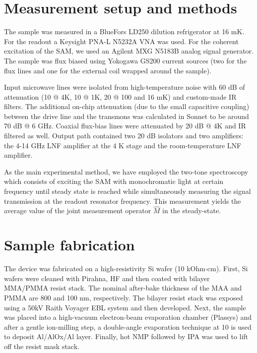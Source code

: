 \documentclass[%
 pra,
 amsmath,amssymb,
 reprint,%
]{revtex4-1}
\begin{document}
\section{Measurement setup and 
methods}\label{sec:meas_setup}
The sample was measured in a BlueFors LD250 dilution refrigerator at 16 mK. For the readout a Keysight PNA-L N5232A VNA was used. For the coherent excitation of the SAM, we used an Agilent MXG N5183B analog signal generator. The sample was 
flux biased using Yokogawa GS200 current sources (two for the flux lines and one for the external coil wrapped around the sample).

Input microwave lines were isolated from 
high-temperature noise with 60 dB of attenuation 
(10 @ 4K, 10 @ 1K, 20 @ 100 and 16 mK) and 
custom-made IR filters. The additional on-chip 
attenuation (due to the small capacitive 
coupling) between the drive line and the 
transmons was calculated in Sonnet to be around 
70 dB @ 6 GHz. Coaxial flux-bias lines were 
attenuated by 20 dB @ 4K and IR filtered as well. 
Output path contained two 20 dB isolators and two 
amplifiers: the 4-14 GHz LNF amplifier at the 4 K 
stage and the room-temperature LNF amplifier.

As the main experimental method, we have employed the two-tone spectroscopy which consists of exciting the SAM with monochromatic light at certain frequency until steady state is reached while simultaneously measuring the signal transmission at the readout resonator frequency. This measurement yields the average value of the joint measurement operator $\hat M$ in the steady-state.

\section{Sample fabrication}\label{sec:fab}
The device was fabricated on a high-resistivity
Si wafer (10 kOhm$\cdot$cm). First, Si wafers 
were cleaned with Pirahna, HF and then coated 
with bilayer MMA/PMMA resist stack. The nominal 
after-bake thickness of the MAA and PMMA are 800 
and 100 nm, respectively. The
bilayer resist stack was exposed using a 50kV 
Raith Voyager EBL system and then developed. 
Next, the sample was placed into a high-vacuum 
electron-beam evaporation
chamber (Plassys) and after a gentle ion-milling 
step, a double-angle evaporation technique at 10 
is used to deposit Al/AlOx/Al layer. Finally, hot 
NMP followed by IPA was used to lift off the 
resist mask stack.

\end{document}
